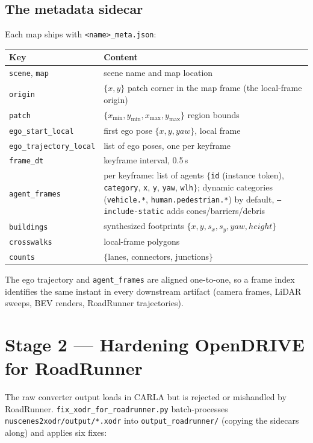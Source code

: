 \documentclass[11pt]{article}
\newcommand{\code}[1]{{\setlength{\fboxsep}{1.5pt}\colorbox{codegray}{\small\texttt{#1}}}}
\newcommand{\file}[1]{\texttt{#1}}
\begin{document}
\subsection{The metadata sidecar}
\label{sec:sidecar}
Each map ships with \file{<name>\_meta.json}:

\begin{center}
\small
\begin{tabular}{@{}lp{9.6cm}@{}}
\toprule
\textbf{Key} & \textbf{Content} \\
\midrule
\code{scene}, \code{map} & scene name and map location \\
\code{origin} & $\{x, y\}$ patch corner in the map frame (the local-frame origin) \\
\code{patch} & $\{x_{\min}, y_{\min}, x_{\max}, y_{\max}\}$ region bounds \\
\code{ego\_start\_local} & first ego pose $\{x, y, \mathit{yaw}\}$, local frame \\
\code{ego\_trajectory\_local} & list of ego poses, one per keyframe \\
\code{frame\_dt} & keyframe interval, 0.5\,s \\
\code{agent\_frames} & per keyframe: list of agents $\{$\code{id} (instance token),
  \code{category}, \code{x}, \code{y}, \code{yaw}, \code{wlh}$\}$; dynamic categories
  (\code{vehicle.*}, \code{human.pedestrian.*}) by default,
  \code{--include-static} adds cones/barriers/debris \\
\code{buildings} & synthesized footprints $\{x, y, s_x, s_y, \mathit{yaw}, \mathit{height}\}$ \\
\code{crosswalks} & local-frame polygons \\
\code{counts} & $\{$lanes, connectors, junctions$\}$ \\
\bottomrule
\end{tabular}
\end{center}

The ego trajectory and \code{agent\_frames} are aligned one-to-one, so a frame index
identifies the same instant in every downstream artifact (camera frames, LiDAR sweeps,
BEV renders, RoadRunner trajectories).

\section{Stage 2 --- Hardening OpenDRIVE for RoadRunner}
\label{sec:fixer}

The raw converter output loads in CARLA but is rejected or mishandled by RoadRunner.
\file{fix\_xodr\_for\_roadrunner.py} batch-processes \file{nuscenes2xodr/output/*.xodr}
into \file{output\_roadrunner/} (copying the sidecars along) and applies six fixes:
\end{document}
